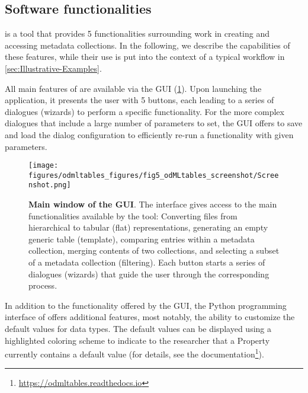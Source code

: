\subsection{Software functionalities}
\label{sec:software_functionalities} 

 is a tool that provides 5 functionalities surrounding work in creating and accessing metadata collections. In the following, we describe the capabilities of these features, while their use is put into the context of a typical workflow in \cref{sec:Illustrative-Examples}.

All main features of  are available via the  GUI (\cref{fig:GUI_mainwindow}). Upon launching the application, it presents the user with 5 buttons, each leading to a series of dialogues (wizards) to perform a specific  functionality. For the more complex dialogues that include a large number of parameters to set, the GUI offers to save and load the dialog configuration to efficiently re-run a functionality with given parameters. 

\begin{figure}[hbt]
\begin{center}
\texttt{[image: figures/odmltables\_figures/fig5\_odMLtables\_screenshot/Screenshot.png]}
\caption[Main window of the  GUI]{{\label{fig:GUI_mainwindow}
\textbf{Main window of the  GUI}. The interface gives access to the main functionalities available by the tool: Converting files from hierarchical to tabular (flat) representations, generating an empty generic  table (template), comparing entries within a metadata collection, merging contents of two collections, and selecting a subset of a metadata collection (filtering). Each button starts a series of dialogues (wizards) that guide the user through the corresponding process.
}}
\end{center}
\end{figure}

In addition to the functionality offered by the GUI, the Python programming interface of  offers additional features, most notably, the ability to customize the default values for  data types. The default values can be displayed using a highlighted coloring scheme to indicate to the researcher that a Property currently contains a default value (for details, see the  documentation\footnote{\url{https://odmltables.readthedocs.io}}).

